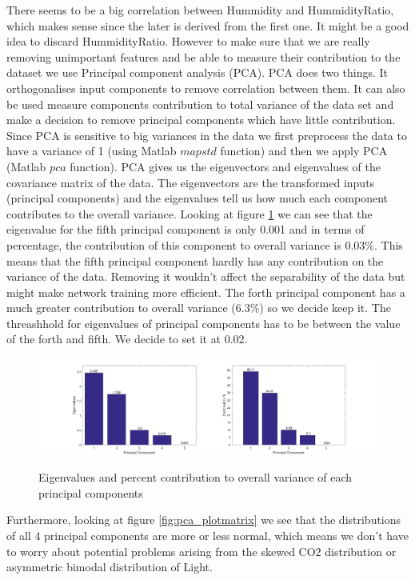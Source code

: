 \documentclass[a4paper, 11pt]{article}
\begin{document}
There seems to be a big correlation between Hummidity and HummidityRatio, which makes sense since the later is derived from the first one. It might be a good idea to discard HummidityRatio. However to make sure that we are really removing unimportant features and be able to measure their contribution to the dataset we use Principal component analysis (PCA). PCA does two things. It orthogonalises input components to remove correlation between them. It can also be used measure components contribution to total variance of the data set and make a decision to remove principal components which have little contribution. Since PCA is sensitive to big variances in the data we first preprocess the data to have a variance of 1 (using Matlab $mapstd$ function) and then we apply PCA (Matlab $pca$ function). PCA gives us the eigenvectors and eigenvalues of the covariance matrix of the data. The eigenvectors are the transformed inputs (principal components) and the eigenvalues tell us how much each component contributes to the overall variance. Looking at figure \ref{fig:eigenvalues} we can see that the eigenvalue for the fifth principal component is only 0.001 and in terms of percentage, the contribution of this component to overall variance is 0.03\%. This means that the fifth principal component hardly has any contribution on the variance of the data. Removing it wouldn't affect the separability of the data but might make network training more efficient. The forth principal component has a much greater contribution to overall variance (6.3\%) so we decide keep it. The threashhold for eigenvalues of principal components has to be between the value of the forth and fifth. We decide to set it at 0.02. 

\begin{figure}[h]
  \caption{Eigenvalues and percent contribution to overall variance of each principal components}
  \centering
    \includegraphics[width=1\textwidth]{../figures/eigenvalues.png}
    \label{fig:eigenvalues}
\end{figure}

Furthermore, looking at figure \ref{fig:pca_plotmatrix} we see that the distributions of all 4 principal components are more or less normal, which means we don't have to worry about potential problems arising from the skewed CO2 distribution or asymmetric bimodal distribution of Light. 
\end{document}
